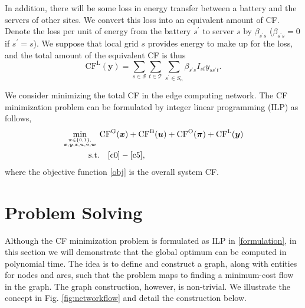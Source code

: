 \documentclass[conference, 10pt, ﬁnal, letterpaper, twocolumn]{IEEEtran}
\begin{document}
In addition, there will be some loss in energy transfer between a battery and the servers of other sites. We convert this loss into an equivalent amount of CF. Denote the loss per unit of energy from the battery $s^\prime$ to server $s$ by $\beta_{s^\prime s}$ ($\beta_{s^\prime s} = 0$ if $s^\prime = s$). We suppose that local grid $s$ provides energy to make up for the loss, and the total amount of the equivalent CF is thus 
\begin{equation}\label{lo}
    \text{CF}^{\text{L}}(\boldsymbol{y}) = \sum_{s \in \mathcal{S}}  \sum_{t \in \mathcal{T}}\sum_{s^\prime \in S_n}  \beta_{s^\prime s} I_{st} y _{ss^\prime t}.
\end{equation}

We consider minimizing the total CF in the edge computing network. The CF minimization problem can be formulated by integer linear programming (ILP) as follows,
\begin{subequations}\label{formulation}
    \begin{align}
         \mathop{\min}_{\boldsymbol{\pi} \in \{0,1\}, \atop \boldsymbol{x}, \boldsymbol{y}, \boldsymbol{z}, \boldsymbol{u}, \boldsymbol{v}, \boldsymbol{w}} \ & \text{CF}^{\text{G}}(\boldsymbol{x}) +  \text{CF}^{\text{B}}(\boldsymbol{u}) + \text{CF}^{\text{O}}(\boldsymbol{\pi}) + \text{CF}^{\text{L}}(\boldsymbol{y}) \label{obj}\\
         \text{s.t.} & \quad \eqref{c0} - \eqref{c5},\notag
    \end{align}
\end{subequations}
where the objective function \eqref{obj} is the overall system CF.

\section{Problem Solving} 

% 
% 


Although the CF minimization problem is formulated as ILP in \eqref{formulation}, in this section we will demonstrate that the global optimum can be computed in polynomial time. The idea is to define and construct a graph, along with entities for nodes and arcs, such that the problem maps to finding a minimum-cost flow in the graph. The graph construction, however, is non-trivial. We illustrate the concept in Fig. \ref{fig:networkflow} and detail the construction below.
\end{document}
